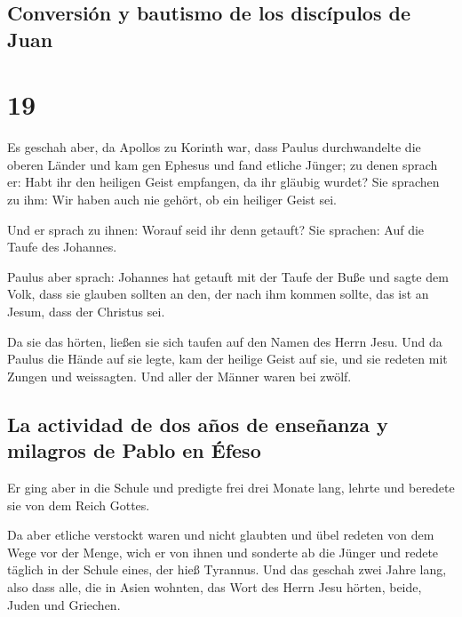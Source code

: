 \hypertarget{conversiuxf3n-y-bautismo-de-los-discuxedpulos-de-juan}{%
\subsection{Conversión y bautismo de los discípulos de
Juan}\label{conversiuxf3n-y-bautismo-de-los-discuxedpulos-de-juan}}

\hypertarget{section-18}{%
\section{19}\label{section-18}}

 Es geschah aber, da Apollos zu Korinth war, dass Paulus
durchwandelte die oberen Länder und kam gen Ephesus und fand etliche
Jünger;  zu denen sprach er: Habt ihr den heiligen Geist
empfangen, da ihr gläubig wurdet? Sie sprachen zu ihm: Wir haben auch
nie gehört, ob ein heiliger Geist sei.

 Und er sprach zu ihnen: Worauf seid ihr denn getauft? Sie
sprachen: Auf die Taufe des Johannes.

 Paulus aber sprach: Johannes hat getauft mit der Taufe
der Buße und sagte dem Volk, dass sie glauben sollten an den, der nach
ihm kommen sollte, das ist an Jesum, dass der Christus sei.

 Da sie das hörten, ließen sie sich taufen auf den Namen
des Herrn Jesu.  Und da Paulus die Hände auf sie legte,
kam der heilige Geist auf sie, und sie redeten mit Zungen und
weissagten.  Und aller der Männer waren bei zwölf.

\hypertarget{la-actividad-de-dos-auxf1os-de-enseuxf1anza-y-milagros-de-pablo-en-uxe9feso}{%
\subsection{La actividad de dos años de enseñanza y milagros de Pablo en
Éfeso}\label{la-actividad-de-dos-auxf1os-de-enseuxf1anza-y-milagros-de-pablo-en-uxe9feso}}

 Er ging aber in die Schule und predigte frei drei Monate
lang, lehrte und beredete sie von dem Reich Gottes.

 Da aber etliche verstockt waren und nicht glaubten und
übel redeten von dem Wege vor der Menge, wich er von ihnen und sonderte
ab die Jünger und redete täglich in der Schule eines, der hieß Tyrannus.
 Und das geschah zwei Jahre lang, also dass alle, die in
Asien wohnten, das Wort des Herrn Jesu hörten, beide, Juden und
Griechen.

